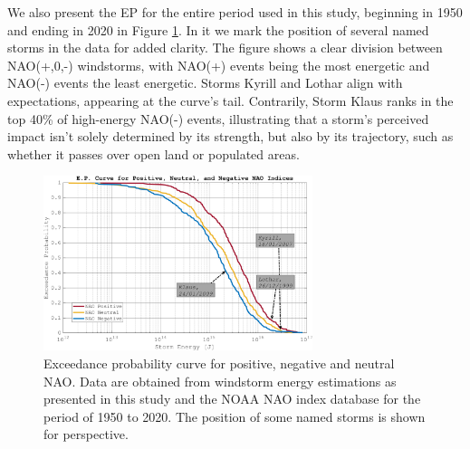     We also present the EP for the entire period used in this study, beginning in 1950 and ending in 2020 in Figure \ref{fig:EP_Curve_NAO(p,n)_1950-2020}. In it we mark the position of several named storms in the data for added clarity. The figure shows a clear division between NAO(+,0,-) windstorms, with NAO(+) events being the most energetic and NAO(-) events the least energetic. Storms Kyrill and Lothar align with expectations, appearing at the curve's tail. Contrarily, Storm Klaus ranks in the top 40\% of high-energy NAO(-) events, illustrating that a storm's perceived impact isn't solely determined by its strength, but also by its trajectory, such as whether it passes over open land or populated areas.

        \begin{figure}
            \centering
            \includegraphics[width=0.7\textwidth]{figures/EP Curve NAO(p,n), 1950-2020(small)_with_neutral_nao.png}
            \caption{Exceedance probability curve for positive, negative and neutral NAO. Data are obtained from windstorm energy estimations as presented in this study and the NOAA NAO index database for the period of 1950 to 2020. The position of some named storms is shown for perspective.}
            \label{fig:EP_Curve_NAO(p,n)_1950-2020}
        \end{figure}

